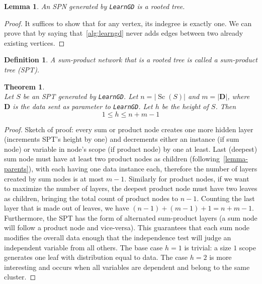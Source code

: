 \documentclass{amsart}
\DeclareMathOperator*{\Sc}{\text{Sc}}
\theoremstyle{plain}
\newcounter{dummy-def}\numberwithin{dummy-def}{section}
\newtheorem{definition}[dummy-def]{Definition}
\newcounter{dummy-thm}\numberwithin{dummy-thm}{section}
\newtheorem{theorem}[dummy-thm]{Theorem}
\newcounter{dummy-prop}\numberwithin{dummy-prop}{section}
\newcounter{dummy-corollary}\numberwithin{dummy-corollary}{section}
\newcounter{dummy-lemma}\numberwithin{dummy-lemma}{section}
\newtheorem{lemma}[dummy-lemma]{Lemma}
\newcounter{dummy-ex}\numberwithin{dummy-ex}{section}
\newcounter{dummy-eg}\numberwithin{dummy-eg}{section}
\numberwithin{equation}{section}
\newcommand{\set}[1]{\mathbf{#1}}
\newcommand{\code}[1]{\lstinline[mathescape=true]{#1}}
\begin{document}
\begin{lemma}
  An SPN generated by \code{LearnGD} is a rooted tree.
\end{lemma}
\begin{proof}
  It suffices to show that for any vertex, its indegree is exactly one. We can prove that by saying
  that~\autoref{alg:learngd} never adds edges between two already existing vertices.
\end{proof}

\begin{definition}
  A sum-product network that is a rooted tree is called a sum-product tree (SPT).
\end{definition}

\begin{theorem}~\\
  Let $S$ be an SPT generated by \code{LearnGD}. Let $n=|\Sc(S)|$ and $m=|\set{D}|$, where
  $\set{D}$ is the data sent as parameter to \code{LearnGD}. Let $h$ be the height of $S$. Then
  \begin{equation*}
    1 \leq h \leq n + m - 1
  \end{equation*}
\end{theorem}
\begin{proof}
  Sketch of proof: every sum or product node creates one more hidden layer (increments SPT's height
  by one) and decrements either an instance (if sum node) or variable in node's scope (if product
  node) by one at least. Last (deepest) sum node must have at least two product nodes as children
  (following~\autoref{lemma-parents}), with each having one data instance each, therefore the
  number of layers created by sum nodes is at most $m-1$. Similarly for product nodes, if we want
  to maximize the number of layers, the deepest product node must have two leaves as children,
  bringing the total count of product nodes to $n-1$. Counting the last layer that is made out of
  leaves, we have $(n-1)+(m-1)+1=n+m-1$. Furthermore, the SPT has the form of alternated
  sum-product layers (a sum node will follow a product node and vice-versa). This guarantees that
  each sum node modifies the overall data enough that the independence test will judge an
  independent variable from all others. The base case $h=1$ is trivial: a size $1$ scope generates
  one leaf with distribution equal to data. The case $h=2$ is more interesting and occurs when all
  variables are dependent and belong to the same cluster.
\end{proof}
\end{document}
